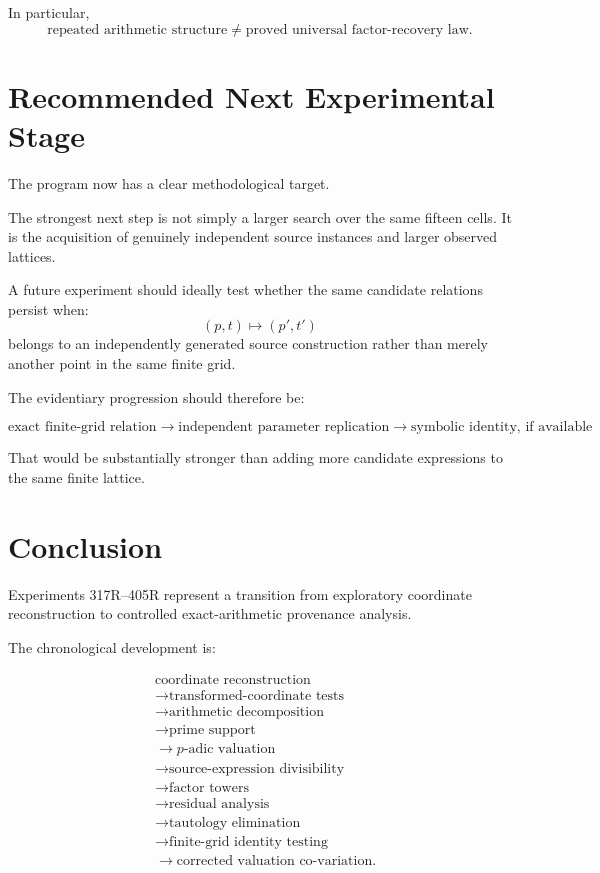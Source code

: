 \documentclass[11pt,a4paper]{article}
\begin{document}
In particular,
\[
\boxed{
\text{repeated arithmetic structure}
\neq
\text{proved universal factor-recovery law}.
}
\]

\section{Recommended Next Experimental Stage}

The program now has a clear methodological target.

The strongest next step is not simply a larger search over the same fifteen cells. It is the acquisition of genuinely independent source instances and larger observed lattices.

A future experiment should ideally test whether the same candidate relations persist when:
\[
(p,t)\mapsto (p',t')
\]
belongs to an independently generated source construction rather than merely another point in the same finite grid.

The evidentiary progression should therefore be:

\[
\boxed{
\text{exact finite-grid relation}
\rightarrow
\text{independent parameter replication}
\rightarrow
\text{symbolic identity, if available}
}.
\]

That would be substantially stronger than adding more candidate expressions to the same finite lattice.

\section{Conclusion}

Experiments 317R--405R represent a transition from exploratory coordinate reconstruction to controlled exact-arithmetic provenance analysis.

The chronological development is:

\[
\boxed{
\begin{aligned}
&\text{coordinate reconstruction}\\
&\rightarrow\text{transformed-coordinate tests}\\
&\rightarrow\text{arithmetic decomposition}\\
&\rightarrow\text{prime support}\\
&\rightarrow p\text{-adic valuation}\\
&\rightarrow\text{source-expression divisibility}\\
&\rightarrow\text{factor towers}\\
&\rightarrow\text{residual analysis}\\
&\rightarrow\text{tautology elimination}\\
&\rightarrow\text{finite-grid identity testing}\\
&\rightarrow\text{corrected valuation co-variation}.
\end{aligned}
}
\]
\end{document}
